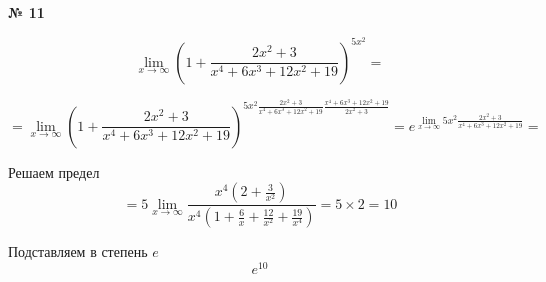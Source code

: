 \documentclass{article}
\begin{document}
\textbf{№ 11} 
\large

$$ \lim\limits_{x \to \infty} \left( 1 + \frac{2x^2+3}{x^4+6x^3+12x^2+19} \right)^{5x^2}
= $$  

$$ = \lim\limits_{x \to \infty} \left( 1 + \frac{2x^2+3}{x^4+6x^3+12x^2+19} \right)^{5x^2 \frac{2x^2+3}{x^4+6x^3+12x^2+19} \frac{x^4+6x^3+12x^2+19}{2x^2+3}}
= e^{\lim\limits_{x \to \infty} 5x^2 \frac{2x^2+3}{x^4+6x^3+12x^2+19}}
= $$

Решаем предел
$$ = 5 \lim\limits_{x \to \infty} \frac{x^4(2+\frac{3}{x^2})}{x^4(1+\frac{6}{x}+\frac{12}{x^2}+\frac{19}{x^4})}
= 5 \times 2 
= 10 $$

Подставляем в степень $ e $
$$ e^{10} $$
\end{document}
